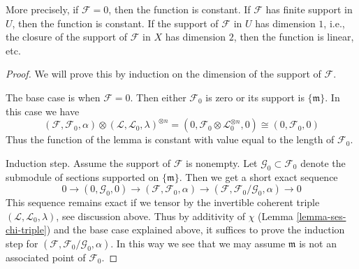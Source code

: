 \documentclass{stacks-project}
\theoremstyle{plain}
\theoremstyle{definition}
\theoremstyle{remark}
\numberwithin{equation}{subsection}
\begin{document}
\noindent
More precisely, if $\mathcal{F} = 0$, then the function is constant.
If $\mathcal{F}$ has finite support in $U$, then the function is constant.
If the support of $\mathcal{F}$ in $U$ has dimension $1$, i.e., the
closure of the support of $\mathcal{F}$ in $X$ has dimension $2$, then
the function is linear, etc.

\begin{proof}
We will prove this by induction on the dimension of the support of
$\mathcal{F}$.

\medskip\noindent
The base case is when $\mathcal{F} = 0$. Then either
$\mathcal{F}_0$ is zero or its support is $\{\mathfrak m\}$.
In this case we have
$$
(\mathcal{F}, \mathcal{F}_0, \alpha) \otimes
(\mathcal{L}, \mathcal{L}_0, \lambda)^{\otimes n} =
(0, \mathcal{F}_0 \otimes \mathcal{L}_0^{\otimes n}, 0) \cong
(0, \mathcal{F}_0, 0)
$$
Thus the function of the lemma is constant with value equal
to the length of $\mathcal{F}_0$.

\medskip\noindent
Induction step. Assume the support of $\mathcal{F}$ is nonempty.
Let $\mathcal{G}_0 \subset \mathcal{F}_0$ denote the submodule
of sections supported on $\{\mathfrak m\}$. Then we get a short
exact sequence
$$
0 \to (0, \mathcal{G}_0, 0) \to
(\mathcal{F}, \mathcal{F}_0, \alpha) \to
(\mathcal{F}, \mathcal{F}_0/\mathcal{G}_0, \alpha) \to 0
$$
This sequence remains exact if we tensor by the invertible
coherent triple $(\mathcal{L}, \mathcal{L}_0, \lambda)$, see
discussion above. Thus by additivity of $\chi$
(Lemma \ref{lemma-ses-chi-triple})
and the base case explained above, it suffices to prove
the induction step for
$(\mathcal{F}, \mathcal{F}_0/\mathcal{G}_0, \alpha)$.
In this way we see that we may assume $\mathfrak m$ is not
an associated point of $\mathcal{F}_0$.


\end{proof}
\end{document}
